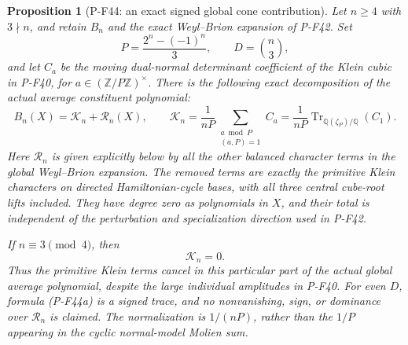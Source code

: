 \documentclass[11pt,a4paper]{article}
\newtheorem{proposition}{Proposition}[section]
\begin{document}
\begin{proposition}[P-F44: an exact signed global cone contribution]
\label{prop:kleinglobalcontribution}
Let $n\ge4$ with $3\nmid n$, and retain $B_n$ and the exact
Weyl--Brion expansion of P-F42. Set
\[
 P=\frac{2^n-(-1)^n}{3},\qquad D=\binom n3,
\]
and let $C_a$ be the moving dual-normal determinant coefficient
of the Klein cubic in P-F40, for $a\in(\mathbb Z/P\mathbb Z)^\times$.
There is the following exact decomposition of the \emph{actual}
average constituent polynomial:
\[
 B_n(X)=\mathcal K_n+\mathcal R_n(X),\qquad
 \mathcal K_n=
   \frac1{nP}\sum_{\substack{a\bmod P\\(a,P)=1}}C_a
   =\frac1{nP}\operatorname{Tr}_{\mathbb Q(\zeta_P)/\mathbb Q}(C_1).
 \tag{P-F44a}
\]
Here $\mathcal R_n$ is given explicitly below by all the other
balanced character terms in the global Weyl--Brion expansion.
The removed terms are exactly the primitive Klein characters
on directed Hamiltonian-cycle bases, with all three central
cube-root lifts included.
They have degree zero as polynomials in $X$, and their total
is independent of the perturbation and specialization direction
used in P-F42.

If $n\equiv3\pmod4$, then
\[
                              \mathcal K_n=0.
 \tag{P-F44b}
\]
Thus the primitive Klein terms cancel in this particular
part of the actual global average polynomial, despite the
large individual amplitudes in P-F40.
For even $D$, formula (P-F44a) is a signed trace, and no
nonvanishing, sign, or dominance over $\mathcal R_n$ is claimed.
The normalization is $1/(nP)$, rather than the $1/P$ appearing
in the cyclic normal-model Molien sum.
\end{proposition}
\end{document}

